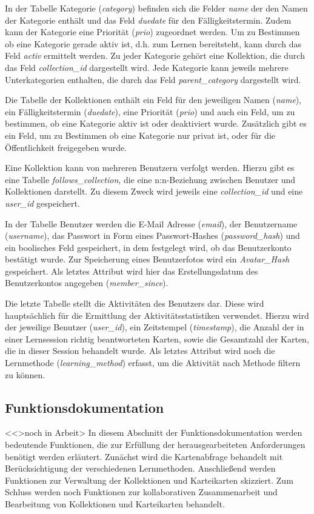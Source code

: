 In der Tabelle Kategorie (\emph{category}) befinden sich die Felder \emph{name} der den Namen der Kategorie enthält und das Feld \emph{duedate} für den Fälligkeitstermin. Zudem kann der Kategorie eine Priorität (\emph{prio}) zugeordnet werden. Um zu Bestimmen ob eine Kategorie gerade aktiv ist, d.h. zum Lernen bereitsteht, kann durch das Feld \emph{activ} ermittelt werden. Zu jeder Kategorie gehört eine Kollektion, die durch das Feld \emph{collection{\_}id} dargestellt wird. Jede Kategorie kann jeweils mehrere Unterkategorien enthalten, die durch das Feld \emph{parent{\_}category} dargestellt wird.

Die Tabelle der Kollektionen enthält ein Feld für den jeweiligen Namen (\emph{name}), ein Fälligkeitstermin (\emph{duedate}), eine Priorität (\emph{prio}) und auch ein Feld, um zu bestimmen, ob eine Kategorie aktiv ist oder deaktiviert wurde. Zusätzlich gibt es ein Feld, um zu Bestimmen ob eine Kategorie nur privat ist, oder für die Öffentlichkeit freigegeben wurde. 

Eine Kollektion kann von mehreren Benutzern verfolgt werden. Hierzu gibt es eine Tabelle \emph{follows{\_}collection}, die eine n:n-Beziehung zwischen Benutzer und Kollektionen darstellt. Zu diesem Zweck wird jeweils eine \emph{collection{\_}id} und eine \emph{user{\_}id} gespeichert. 

In der Tabelle Benutzer werden die E-Mail Adresse (\emph{email}), der Benutzername (\emph{username}), das Passwort in Form eines Passwort-Hashes (\emph{password{\_}hash}) und ein boolisches Feld gespeichert, in dem festgelegt wird, ob das Benutzerkonto bestätigt wurde. Zur Speicherung eines Benutzerfotos wird ein \emph{Avatar{\_}Hash} gespeichert. Als letztes Attribut wird hier das Erstellungsdatum des Benutzerkontos angegeben (\emph{member{\_}since}).

Die letzte Tabelle stellt die Aktivitäten des Benutzers dar. Diese wird hauptsächlich für die Ermittlung der Aktivitätsstatistiken verwendet. Hierzu wird der jeweilige Benutzer (\emph{user{\_}id}), ein Zeitstempel (\emph{timestamp}), die Anzahl der in einer Lernsession richtig beantworteten Karten, sowie die Gesamtzahl der Karten, die in dieser Session behandelt wurde. Als letztes Attribut wird noch die Lernmethode (\emph{learning{\_}method}) erfasst, um die Aktivität nach Methode filtern zu können.




\subsection{Funktionsdokumentation}
<<>noch in Arbeit>
In diesem Abschnitt der Funktionsdokumentation werden bedeutende Funktionen, die zur Erfüllung der herausgearbeiteten Anforderungen benötigt werden erläutert. Zunächst wird die Kartenabfrage behandelt mit Berücksichtigung der verschiedenen Lernmethoden. Anschließend werden Funktionen zur Verwaltung der Kollektionen und Karteikarten skizziert. Zum Schluss werden noch Funktionen zur kollaborativen Zusammenarbeit und Bearbeitung von Kollektionen und Karteikarten behandelt.

